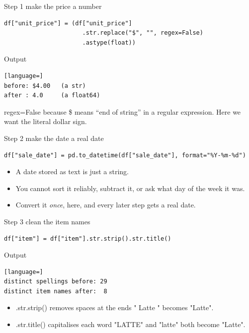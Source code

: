 \documentclass[aspectratio=169,10pt]{beamer}
\newcommand{\py}[1]{{\ttfamily\footnotesize\color{ink}#1}}
\newcommand{\Out}{\vspace{-2pt}\textcolor{muted}{\scriptsize\textsf{Output}}\vspace{-4pt}}
\begin{document}
\begin{frame}[fragile]{Step 1 \textemdash{} make the price a number}
\begin{lstlisting}
df["unit_price"] = (df["unit_price"]
                      .str.replace("$", "", regex=False)
                      .astype(float))
\end{lstlisting}
  \Out
\begin{lstlisting}[language=]
before: $4.00   (a str)
after : 4.0     (a float64)
\end{lstlisting}

  \pause
  \begin{aside}
    \small
    \py{regex=False} because \py{\$} means ``end of string'' in a regular expression. Here we want the
    literal dollar sign.
  \end{aside}
\end{frame}

\begin{frame}[fragile]{Step 2 \textemdash{} make the date a real date}
\begin{lstlisting}
df["sale_date"] = pd.to_datetime(df["sale_date"], format="%Y-%m-%d")
\end{lstlisting}

  \pause
  \begin{itemize}[<+->]
    \item A date stored as text is just a string.
    \item You cannot sort it reliably, subtract it, or ask what day of the week it was.
    \item Convert it \emph{once}, here, and every later step gets a real date.
  \end{itemize}
\end{frame}

\begin{frame}[fragile]{Step 3 \textemdash{} clean the item names}
\begin{lstlisting}
df["item"] = df["item"].str.strip().str.title()
\end{lstlisting}
  \Out
\begin{lstlisting}[language=]
distinct spellings before: 29
distinct item names after:  8
\end{lstlisting}

  \pause
  \begin{itemize}[<+->]
    \item \py{.str.strip()} removes spaces at the ends \textemdash{} \py{"  Latte "} becomes
          \py{"Latte"}.
    \item \py{.str.title()} capitalises each word \textemdash{} \py{"LATTE"} and \py{"latte"} both
          become \py{"Latte"}.
  \end{itemize}
\end{frame}
\end{document}
